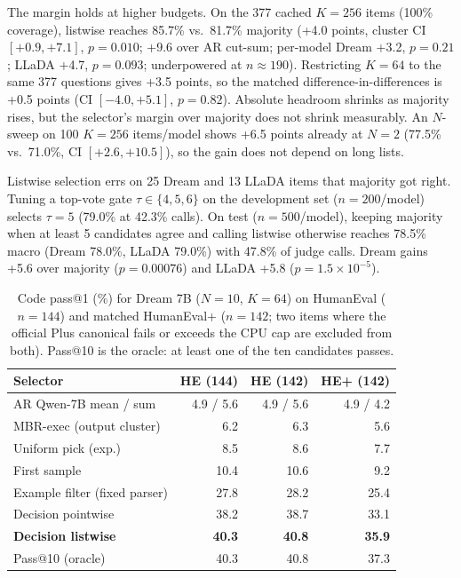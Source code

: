 The margin holds at higher budgets. On the 377 cached $K=256$ items (100\% coverage), listwise reaches 85.7\% vs.\ 81.7\% majority (+4.0 points, cluster CI $[+0.9,+7.1]$, $p=0.010$; +9.6 over AR cut-sum; per-model Dream +3.2, $p=0.21$; LLaDA +4.7, $p=0.093$; underpowered at $n\approx 190$). Restricting $K=64$ to the same 377 questions gives +3.5 points, so the matched difference-in-differences is +0.5 points (CI $[-4.0,+5.1]$, $p=0.82$). Absolute headroom shrinks as majority rises, but the selector's margin over majority does not shrink measurably. An $N$-sweep on 100 $K=256$ items/model shows +6.5 points already at $N=2$ (77.5\% vs.\ 71.0\%, CI $[+2.6,+10.5]$), so the gain does not depend on long lists.

Listwise selection errs on 25 Dream and 13 LLaDA items that majority got right. Tuning a top-vote gate $\tau\in\{4,5,6\}$ on the development set ($n=200$/model) selects $\tau=5$ (79.0\% at 42.3\% calls). On test ($n=500$/model), keeping majority when at least 5 candidates agree and calling listwise otherwise reaches 78.5\% macro (Dream 78.0\%, LLaDA 79.0\%) with 47.8\% of judge calls. Dream gains +5.6 over majority ($p=0.00076$) and LLaDA +5.8 ($p=1.5\times 10^{-5}$).

\begin{table}[!t]
\centering
\caption{Code pass@1 (\%) for Dream 7B ($N=10$, $K=64$) on HumanEval ($n=144$) and matched HumanEval+ ($n=142$; two items where the official Plus canonical fails or exceeds the CPU cap are excluded from both). Pass@10 is the oracle: at least one of the ten candidates passes.}
\label{tab:humaneval}
\scriptsize
\setlength{\tabcolsep}{2.0pt}
\begin{tabular}{@{}lrrr@{}}
\toprule
Selector & HE (144) & HE (142) & HE+ (142) \\
\midrule
AR Qwen-7B mean / sum & 4.9 / 5.6 & 4.9 / 5.6 & 4.9 / 4.2 \\
MBR-exec (output cluster) & 6.2 & 6.3 & 5.6 \\
Uniform pick (exp.) & 8.5 & 8.6 & 7.7 \\
First sample & 10.4 & 10.6 & 9.2 \\
Example filter (fixed parser) & 27.8 & 28.2 & 25.4 \\
Decision pointwise & 38.2 & 38.7 & 33.1 \\
\textbf{Decision listwise} & \textbf{40.3} & \textbf{40.8} & \textbf{35.9} \\
\midrule
Pass@10 (oracle) & 40.3 & 40.8 & 37.3 \\
\bottomrule
\end{tabular}
\end{table}


